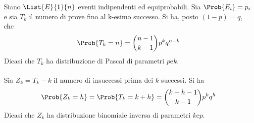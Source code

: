 \documentclass{subfiles}
\begin{document}
Siano \(\List{E}{1}{n}\) eventi indipendenti ed equiprobabili. Sia $\Prob{E_{i}} = p_{i}$ e sia $T_{k}$ il numero di prove fino al k-esimo successo.
Si ha, posto $(1 - p) = q$, che
$$
    \Prob{T_{k} = n} = \binom{n - 1}{k - 1} p^{k} q^{n -k}
$$
Dicasi che $T_{k}$ ha distribuzione di Pascal di parametri $p \text{e} k$.
\\ \\
Sia $Z_{k} = T_{k} - k$ il numero di insuccessi prima dei $k$ successi. Si ha
$$
    \Prob{Z_{k} = h} = \Prob{T_{k} = k + h} = \binom{k + h - 1}{k - 1} p^{k}q^{h}
$$
Dicasi che $Z_{k}$ ha distribuzione binomiale inversa di parametri $k \text{e} p$.
\end{document}
